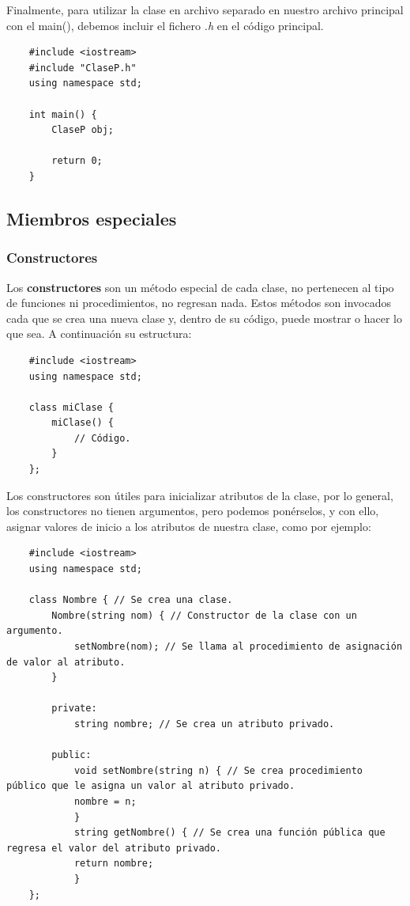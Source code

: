 Finalmente, para utilizar la clase en archivo separado en nuestro archivo principal con el main(), debemos incluir el fichero \textit{.h} en el código principal.
\begin{lstlisting}
    #include <iostream>
    #include "ClaseP.h"
    using namespace std;
    
    int main() {
        ClaseP obj;
        
        return 0;
    }
\end{lstlisting}


\subsection{Miembros especiales}
 
 
\subsubsection{Constructores}
\hspace{0.55cm}Los \textbf{constructores} son un método especial de cada clase, no pertenecen al tipo de funciones ni procedimientos, no regresan nada. Estos métodos son invocados cada que se crea una nueva clase y, dentro de su código, puede mostrar o hacer lo que sea. A continuación su estructura:
\begin{lstlisting}
    #include <iostream>
    using namespace std;
    
    class miClase {
        miClase() {
            // Código.
        }
    };
\end{lstlisting}

Los constructores son útiles para inicializar atributos de la clase, por lo general, los constructores no tienen argumentos, pero podemos ponérselos, y con ello, asignar valores de inicio a los atributos de nuestra clase, como por ejemplo:
\begin{lstlisting}
    #include <iostream>
    using namespace std;

    class Nombre { // Se crea una clase.
        Nombre(string nom) { // Constructor de la clase con un argumento.
            setNombre(nom); // Se llama al procedimiento de asignación de valor al atributo.
        }
        
        private:
            string nombre; // Se crea un atributo privado.
        
        public:
            void setNombre(string n) { // Se crea procedimiento público que le asigna un valor al atributo privado.
            nombre = n;
            }
            string getNombre() { // Se crea una función pública que regresa el valor del atributo privado.
            return nombre;
            }
    };
\end{lstlisting}

